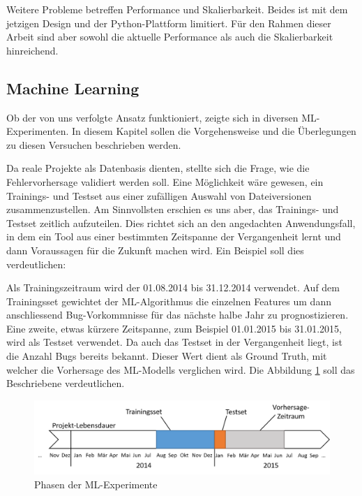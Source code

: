 \documentclass[10pt, a4paper]{article}
\begin{document}
Weitere Probleme betreffen Performance und Skalierbarkeit. Beides ist mit dem jetzigen Design und der Python-Plattform limitiert. Für den Rahmen dieser Arbeit sind aber sowohl die aktuelle Performance als auch die Skalierbarkeit hinreichend.



\subsection{Machine Learning} \label{sec:approach_ml}

Ob der von uns verfolgte Ansatz funktioniert, zeigte sich in diversen \ac{ML}-Ex\-pe\-ri\-menten. In diesem Kapitel sollen die Vorgehensweise und die Überlegungen zu diesen Versuchen beschrieben werden.

Da reale Projekte als Datenbasis dienten, stellte sich die Frage, wie die Fehlervorhersage validiert werden soll. Eine Möglichkeit wäre gewesen, ein Trai\-nings- und Testset aus einer zufälligen Auswahl von Dateiversionen  zusammenzustellen. Am Sinnvollsten erschien es uns aber, das Trainings- und Testset zeitlich aufzuteilen. Dies richtet sich an den angedachten Anwendungsfall, in dem ein Tool aus einer bestimmten Zeitspanne der Vergangenheit lernt und dann Voraussagen für die Zukunft machen wird. Ein Beispiel soll dies verdeutlichen:

Als Trainingszeitraum wird der 01.08.2014 bis 31.12.2014 verwendet. Auf dem Trainingsset gewichtet der \ac{ML}-Algorithmus die einzelnen Features um dann anschliessend Bug-Vorkommnisse für das nächste halbe Jahr zu prognostizieren. Eine zweite, etwas kürzere Zeitspanne, zum Beispiel 01.01.2015 bis 31.01.2015, wird als Testset verwendet. Da auch das Testset in der Vergangenheit liegt, ist die Anzahl Bugs bereits bekannt. Dieser Wert dient als Ground Truth, mit welcher die Vorhersage des \ac{ML}-Modells verglichen wird. Die Abbildung \ref{fig:ml_experiment_phases} soll das Beschriebene verdeutlichen.

\begin{figure}[h]
	\centering
	\includegraphics[width=1\linewidth]{resources/images/ml_experiment_phases.png}
	\caption{Phasen der ML-Experimente}
	\label{fig:ml_experiment_phases}
\end{figure}
\end{document}
